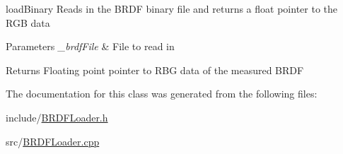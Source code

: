 load\-Binary Reads in the B\-R\-D\-F binary file and returns a float pointer to the R\-G\-B data 


\begin{DoxyParams}{Parameters}
{\em \-\_\-brdf\-File} & File to read in \\
\hline
\end{DoxyParams}
\begin{DoxyReturn}{Returns}
Floating point pointer to R\-B\-G data of the measured B\-R\-D\-F 
\end{DoxyReturn}


The documentation for this class was generated from the following files\-:\begin{DoxyCompactItemize}
\item 
include/\hyperlink{BRDFLoader_8h}{B\-R\-D\-F\-Loader.\-h}\item 
src/\hyperlink{BRDFLoader_8cpp}{B\-R\-D\-F\-Loader.\-cpp}\end{DoxyCompactItemize}

